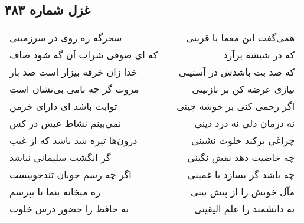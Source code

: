 \begin{center}
\section*{غزل شماره ۴۸۳}
\label{sec:sh483}
\begin{longtable}{l p{0.5cm} r}
سحرگه ره روی در سرزمینی
&&
همی‌گفت این معما با قرینی
\\
که ای صوفی شراب آن گه شود صاف
&&
که در شیشه برآرد 
\\
خدا زان خرقه بیزار است صد بار
&&
که صد بت باشدش در آستینی
\\
مروت گر چه نامی بی‌نشان است
&&
نیازی عرضه کن بر نازنینی
\\
ثوابت باشد ای دارای خرمن
&&
اگر رحمی کنی بر خوشه چینی
\\
نمی‌بینم نشاط عیش در کس
&&
نه درمان دلی نه درد دینی
\\
درون‌ها تیره شد باشد که از غیب
&&
چراغی برکند خلوت نشینی
\\
گر انگشت سلیمانی نباشد
&&
چه خاصیت دهد نقش نگینی
\\
اگر چه رسم خوبان تندخوییست
&&
چه باشد گر بسازد با غمینی
\\
ره میخانه بنما تا بپرسم
&&
مآل خویش را از پیش بینی
\\
نه حافظ را حضور درس خلوت
&&
نه دانشمند را علم الیقینی
\\
\end{longtable}
\end{center}

